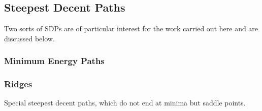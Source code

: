 \subsection{Steepest Decent Paths}
\label{sec:sdps}


\placeholder

Two sorts of SDPs are of particular interest for the work carried out here and are discussed below.

\subsubsection{Minimum Energy Paths}
\label{sec:meps}

\placeholder

\subsubsection{Ridges}
\label{sec:ridges}

Special steepest decent paths, which do not end at minima but saddle points.

\placeholder


